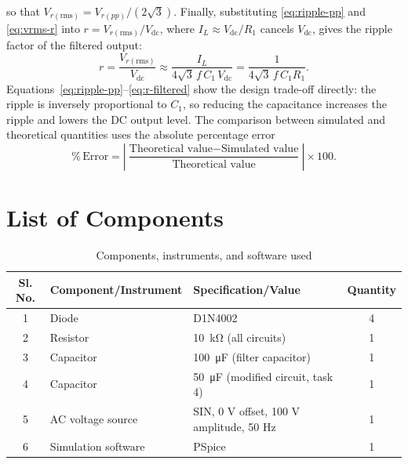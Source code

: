 \documentclass[12pt,a4paper]{article}
\begin{document}
	so that $V_{r(\mathrm{rms})} = V_{r(pp)}/(2\sqrt{3})$. Finally, substituting \eqref{eq:ripple-pp} and \eqref{eq:vrms-r} into $r = V_{r(\mathrm{rms})}/V_{\mathrm{dc}}$, where $I_L \approx V_{\mathrm{dc}}/R_1$ cancels $V_{\mathrm{dc}}$, gives the ripple factor of the filtered output:
	\begin{equation}
		r = \frac{V_{r(\mathrm{rms})}}{V_{\mathrm{dc}}}
		\approx \frac{I_L}{4\sqrt{3}\,f\,C_1\,V_{\mathrm{dc}}}
		= \frac{1}{4\sqrt{3}\, f\, C_1 R_1}.
		\label{eq:r-filtered}
	\end{equation}
	Equations~\eqref{eq:ripple-pp}--\eqref{eq:r-filtered} show the design trade-off directly: the ripple is inversely proportional to $C_1$, so reducing the capacitance increases the ripple and lowers the DC output level. The comparison between simulated and theoretical quantities uses the absolute percentage error
	\begin{equation}
		\%\,\mathrm{Error}
		= \left|\frac{\text{Theoretical value} - \text{Simulated value}}
		{\text{Theoretical value}}\right|\times 100 .
		\label{eq:percentage-error}
	\end{equation}
	
	
	\section{List of Components}
	\begin{table}[H]
		\centering
		\caption{Components, instruments, and software used}
		\label{tab:components}
		\renewcommand{\arraystretch}{1.25}
		\begin{tabular}{|c|l|l|c|}
			\hline
			\textbf{Sl. No.} & \textbf{Component/Instrument} & \textbf{Specification/Value} & \textbf{Quantity} \\
			\hline
			1 & Diode & D1N4002 & 4 \\
			\hline
			2 & Resistor & \SI{10}{\kilo\ohm} (all circuits) & 1 \\
			\hline
			3 & Capacitor & \SI{100}{\micro\farad} (filter capacitor) & 1 \\
			\hline
			4 & Capacitor & \SI{50}{\micro\farad} (modified circuit, task 4) & 1 \\
			\hline
			5 & AC voltage source & SIN, 0 V offset, 100 V amplitude, 50 Hz & 1 \\
			\hline
			6 & Simulation software & PSpice & 1 \\
			\hline
		\end{tabular}
	\end{table}
	
\end{document}
